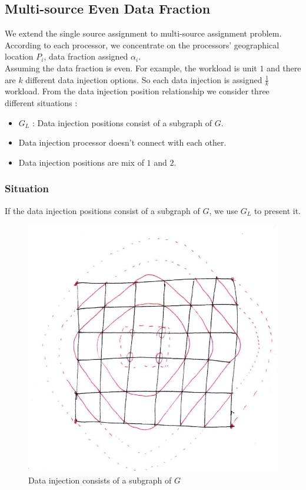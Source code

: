 \subsection{Multi-source Even Data Fraction}
We extend the single source assignment to multi-source assignment problem\cite{jia2010scheduling}.  According to each processor, we concentrate on the processors' geographical location $P_{i}$, data fraction assigned $\alpha_{i}$.
\\
Assuming the data fraction is even.  For example, the workload is unit $1$ and there are $k$ different data injection options.  So each data injection is assigned $\frac{1}{k}$ workload.
From the data injection position relationship we consider three different situations :
\begin{itemize}
\item $G_{L}$ : Data injection positions consist of a subgraph of $G$.
\item Data injection processor doesn't connect with each other.
\item Data injection positions are mix of $1$ and $2$.
\end{itemize}

\subsubsection{Situation \uppercase\expandafter{}}
If the data injection positions consist of a subgraph of $G$, we use $G_{L}$ to present it.
\begin{figure}[!ht]
\centering
\includegraphics[width=0.5\columnwidth]{figure/subgraph1.jpg}
\caption{Data injection consists of a subgraph of $G$}
\label{fig:subgraph1}
\end{figure}

